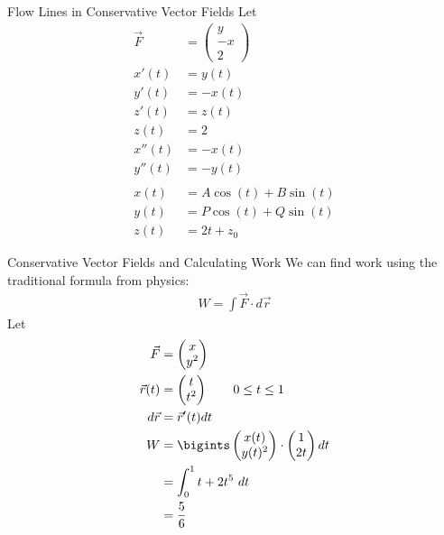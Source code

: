 \documentclass[8pt]{extarticle}
\begin{document}
\begin{problem}{Flow Lines in Conservative Vector Fields}
    Let
    \begin{align*}
      \vec{F} &= \begin{pmatrix}y\\-x\\2\end{pmatrix}\\
      x'(t) &= y(t)\\
      y'(t) &= -x(t)\\
      z'(t) &= z(t)\\
      z(t) &= 2\\
      x''(t) &= -x(t)\\
      y''(t) &= -y(t)\\
      \\
      x(t) &= A\cos(t) + B\sin(t)\\
      y(t) &= P\cos(t) + Q\sin(t)\\
      z(t) &= 2t + z_{0}
    \end{align*}
  \end{problem}
  \begin{problem}{Conservative Vector Fields and Calculating Work}
    We can find work using the traditional formula from physics:
    \begin{align*}
      W = \int \vec{F}\cdot d\vec{r}
    \end{align*}
    Let
    \begin{align*}
      \vec{F} &= \begin{pmatrix}x\\y^2\end{pmatrix}\\
      \vec{r}(t) &= \begin{pmatrix}t\\t^2\end{pmatrix}\tag*{$0\leq t \leq 1$}\\
      d\vec{r} &= \vec{r}'(t)dt\\
      W &= \bigints \begin{pmatrix}x(t)\\y(t)^2\end{pmatrix}\cdot \begin{pmatrix}1\\2t\end{pmatrix} dt\\
        &= \int_{0}^{1}t + 2t^5~dt\\
        &= \frac{5}{6}
    \end{align*}
  \end{problem}
\end{document}
